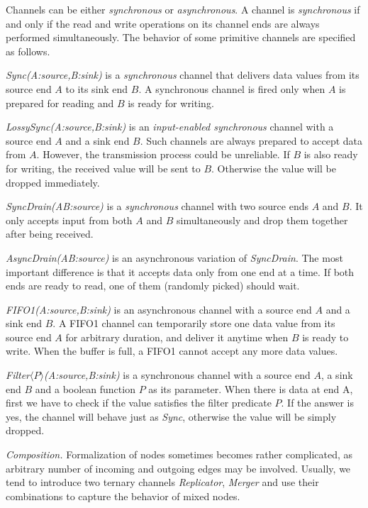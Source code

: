 Channels can be either \emph{synchronous} or \emph{asynchronous}. A channel is \emph{synchronous} if and only if the read and write operations on its channel ends are always performed simultaneously. The behavior of some primitive channels are specified as follows.

\begin{description}
    \item \emph{Sync(A:source,B:sink)} is a \emph{synchronous} channel that delivers data values from its source end $A$ to its sink end $B$. A synchronous channel is fired only when $A$ is prepared for reading and $B$ is ready for writing. 
    \item \emph{LossySync(A:source,B:sink)}
    is an \emph{input-enabled synchronous} channel with a source end $A$ and a sink end $B$. Such channels are always prepared to accept data from $A$. However, the transmission process could be unreliable. If $B$ is also ready for writing, the received value will be sent to $B$. Otherwise the value will be dropped immediately.
    \item \emph{SyncDrain(A\:B:source)} is a \emph{synchronous} channel with two source ends $A$ and $B$. It only accepts input from both $A$ and $B$ simultaneously and drop them together after being received.
    \item \emph{AsyncDrain(A\:B:source)} is an asynchronous variation of \emph{SyncDrain}. The most important difference is that it accepts data only from one end at a time. If both ends are ready to read, one of them (randomly picked) should wait.
    \item \emph{FIFO1(A:source,B:sink)} is an asynchronous channel with a source end $A$ and a sink end $B$. A FIFO1 channel can temporarily store one data value from its source end $A$ for arbitrary duration, and deliver it anytime when $B$ is ready to write. When the buffer is full, a FIFO1 cannot accept any more data values.
    \item \emph{Filter$\langle P\rangle$(A:source,B:sink)}
    is a synchronous channel with a source end $A$, a sink end $B$ and a boolean function $P$ as its parameter. When there is data at end A, first we have to check if the value satisfies the filter predicate $P$. If the answer is yes, the channel will behave just as \emph{Sync}, otherwise the value will be simply dropped.
\end{description}

\noindent\emph{Composition.} Formalization of nodes sometimes becomes rather complicated, as arbitrary number of incoming and outgoing edges may be involved. Usually, we tend to introduce two ternary channels \emph{Replicator}, \emph{Merger} and use their combinations to capture the behavior of mixed nodes.

